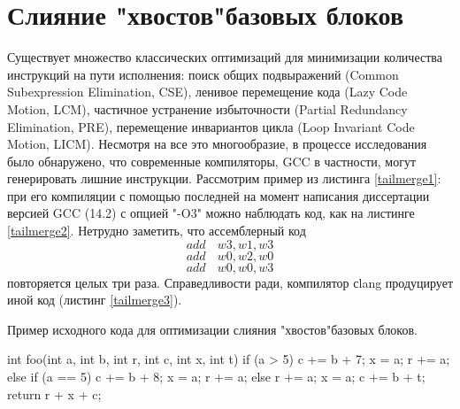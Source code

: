 \section{Слияние "хвостов"\phantom{ }базовых блоков} 

Существует множество классических оптимизаций для минимизации количества инструкций на пути исполнения: поиск общих подвыражений (Common Subexpression Elimination, CSE), ленивое перемещение кода (Lazy Code Motion, LCM), частичное устранение избыточности (Partial Redundancy Elimination, PRE), перемещение инвариантов цикла (Loop Invariant Code Motion, LICM). Несмотря на все это многообразие, в процессе исследования было обнаружено, что современные компиляторы, GCC в частности, могут генерировать лишние инструкции. Рассмотрим пример из листинга \ref{tailmerge1}: при его компиляции с помощью последней на момент написания диссертации версией GCC (14.2) с опцией "-O3" можно наблюдать код, как на листинге \ref{tailmerge2}. Нетрудно заметить, что ассемблерный код 
$$add\phantom{ss}w3, w1, w3$$
$$add\phantom{ss}w0, w2, w0$$
$$add\phantom{ss}w0, w0, w3$$
повторяется целых три раза. Справедливости ради, компилятор сlang продуцирует иной код (листинг \ref{tailmerge3}).

 \begin{ListingEnv}[!h]
	\captiondelim{ } %
	\caption{Пример исходного кода для оптимизации слияния "хвостов"\phantom{ }базовых блоков.}\label{tailmerge1}
	
	\begin{Verb}
         int foo(int a, int b, int r, int c, int x, int t)
         {
         	if (a > 5) {
         		c += b + 7;
         		x = a;
         		r += a;
         	} else if (a == 5) {
         		c += b + 8;
         		x = a;
         		r += a;
         	} else {
         		r += a;
         		x = a;
         		c += b + t;
         	}
         	return r + x + c;
         }
	\end{Verb}
\end{ListingEnv}


